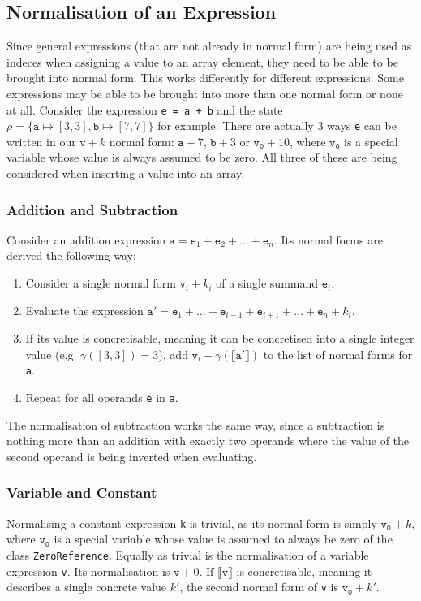 \documentclass{report}
\begin{document}
\subsection{Normalisation of an Expression}\label{sec:expressions:normalisation}

Since general expressions (that are not already in normal form) are being used as indeces when assigning a value to an array element, they need to be able to be brought into normal form. This works differently for different expressions. Some expressions may be able to be brought into more than one normal form or none at all. Consider the expression \texttt{e = a + b} and the state $\rho=\{\mathtt{a}\mapsto[3,3], \mathtt{b}\mapsto[7,7]\}$ for example. There are actually 3 ways \texttt{e} can be written in our $\mathtt{v}+k$ normal form: $\mathtt{a}+7$, $\mathtt{b}+3$ or $\mathtt{v_0}+10$, where $\mathtt{v_0}$ is a special variable whose value is always assumed to be zero. All three of these are being considered when inserting a value into an array.

\subsubsection{Addition and Subtraction}


Consider an addition expression $\mathtt{a}=\mathtt{e}_1 + \mathtt{e}_2+\ldots+\mathtt{e}_n$. Its normal forms are derived the following way:


\begin{enumerate}
	\item Consider a single normal form $\mathtt{v}_i + k_i$ of a single summand $\mathtt{e}_i$.
	\item Evaluate the expression $\mathtt{a}'=\mathtt{e}_1 +\ldots+ \mathtt{e}_{i-1} + \mathtt{e}_{i+1} +\ldots+\mathtt{e}_n+k_i$.
	\item If its value is concretisable, meaning it can be concretised into a single integer value (e.g. $\gamma([3,3])=3$), add $\mathtt{v}_i+\gamma(\llbracket\mathtt{a}'\rrbracket)$ to the list of normal forms for \texttt{a}.
	\item Repeat for all operands \texttt{e} in \texttt{a}. 
\end{enumerate}

\noindent The normalisation of subtraction works the same way, since a subtraction is nothing more than an addition with exactly two operands where the value of the second operand is being inverted when evaluating.

\subsubsection{Variable and Constant}
Normalising a constant expression \texttt{k} is trivial, as its normal form is simply $\mathtt{v_0}+k$, where $\mathtt{v_0}$ is a special variable whose value is assumed to always be zero of the class \texttt{ZeroReference}. Equally as trivial is the normalisation of a variable expression \texttt{v}. Its normalisation is $\mathtt{v}+0$. If $\llbracket\mathtt{v}\rrbracket$ is concretisable, meaning it describes a single concrete value $k'$, the second normal form of \texttt{v} is $\mathtt{v_0}+k'$.
\end{document}
